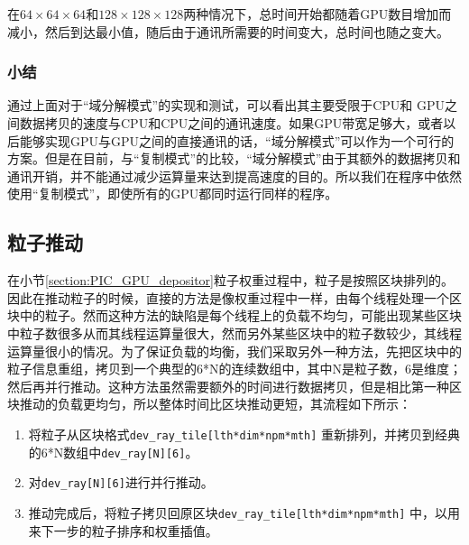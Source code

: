 在$64 \times 64 \times 64$和$128 \times 128 \times 128$两种情况下，总时间开始都随着GPU数目增加而减小，然后到达最小值，随后由于通讯所需要的时间变大，总时间也随之变大。
\subsubsection{小结}
通过上面对于“域分解模式”的实现和测试，可以看出其主要受限于CPU和 GPU之间数据拷贝的速度与CPU和CPU之间的通讯速度。如果GPU带宽足够大，或者以后能够实现GPU与GPU之间的直接通讯的话，“域分解模式”可以作为一个可行的方案。但是在目前，与“复制模式”的比较，“域分解模式”由于其额外的数据拷贝和通讯开销，并不能通过减少运算量来达到提高速度的目的。所以我们在程序中依然使用“复制模式”，即使所有的GPU都同时运行同样的程序。

\subsection{粒子推动}
在小节\ref{section:PIC_GPU_depositor}粒子权重过程中，粒子是按照区块排列的。因此在推动粒子的时候，直接的方法是像权重过程中一样，由每个线程处理一个区块中的粒子。然而这种方法的缺陷是每个线程上的负载不均匀，可能出现某些区块中粒子数很多从而其线程运算量很大，然而另外某些区块中的粒子数较少，其线程运算量很小的情况。为了保证负载的均衡，我们采取另外一种方法，先把区块中的粒子信息重组，拷贝到一个典型的6*N的连续数组中，其中N是粒子数，6是维度；然后再并行推动。这种方法虽然需要额外的时间进行数据拷贝，但是相比第一种区块推动的负载更均匀，所以整体时间比区块推动更短，其流程如下所示：
\begin{enumerate}
  \item 将粒子从区块格式\verb"dev_ray_tile[lth*dim*npm*mth]" 重新排列，并拷贝到经典的6*N数组中\verb"dev_ray[N][6]"。
  \item 对\verb"dev_ray[N][6]"进行并行推动。
  \item 推动完成后，将粒子拷贝回原区块\verb"dev_ray_tile[lth*dim*npm*mth]" 中，以用来下一步的粒子排序和权重插值。
\end{enumerate}


